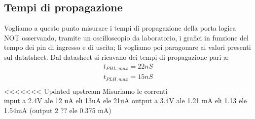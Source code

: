 \documentclass[10pt, a4paper, italian]{article}
\begin{document}
\subsection{Tempi di propagazione}
Vogliamo a questo punto misurare i tempi di propagazione della porta logica NOT osservando, tramite un oscilloscopio da laboratorio, i grafici in funzione del tempo dei pin di ingresso e di uscita; li vogliamo poi paragonare ai valori presenti sul datatsheet.
Dal datasheet si ricavano dei tempi di propagazione pari a:
\begin{gather*}
    t_{PHL,max}=22 nS\\
    t_{PLH,max}=15 nS\\
\end{gather*}
<<<<<<< Updated upstream
Misuriamo le correnti\\ %
input a 2.4V ale 12 uA eli  13uA ele 21uA
output a 3.4V ale 1.21 mA eli 1.13 ele 1.54mA
(output 2 ?? ele 0.375 mA)
\end{document}

